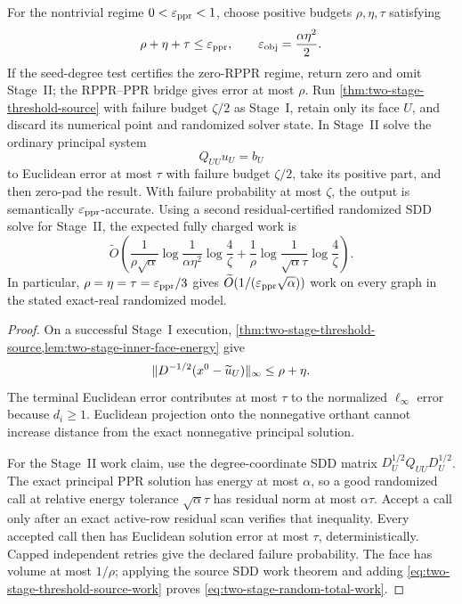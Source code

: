 \begin{theorem}
\label{thm:two-stage-randomized-completion}
For the nontrivial regime $0<\varepsilon_{\mathrm{ppr}}<1$, choose positive budgets
$\rho,\eta,\tau$ satisfying
\begin{equation}
 \rho+\eta+\tau\leq\varepsilon_{\mathrm{ppr}},
 \qquad
 \varepsilon_{\rm obj}=\frac{\alpha\eta^2}{2}.
 \label{eq:two-stage-random-budget}
\end{equation}
If the seed-degree test certifies the zero-RPPR regime, return zero and omit
Stage~II; the RPPR--PPR bridge gives error at most $\rho$.
Run \cref{thm:two-stage-threshold-source} with failure budget $\zeta/2$ as
Stage~I, retain only its face $U$, and discard its numerical point and
randomized solver state.  In
Stage~II solve the ordinary principal system
\begin{equation}
 Q_{UU}u_U=b_U
 \label{eq:two-stage-random-tail}
\end{equation}
to Euclidean error at most $\tau$ with failure budget $\zeta/2$, take its
positive part, and then zero-pad the result.  With failure probability at
most $\zeta$, the output is semantically
$\varepsilon_{\mathrm{ppr}}$-accurate.  Using a second residual-certified randomized SDD solve
for Stage~II, the expected fully charged work is
\begin{equation}
 \widetilde O\!\left(
  \frac{1}{\rho\sqrt\alpha}
  \log\frac1{\alpha\eta^2}
  \log\frac4\zeta
  +\frac1\rho
  \log\frac1{\sqrt\alpha\tau}
  \log\frac4\zeta
 \right).
 \label{eq:two-stage-random-total-work}
\end{equation}
In particular, $\rho=\eta=\tau=\varepsilon_{\mathrm{ppr}}/3$ gives
$\widetilde O(1/(\varepsilon_{\mathrm{ppr}}\sqrt\alpha))$ work on every graph in the stated
exact-real randomized model.
\end{theorem}

\begin{proof}
On a successful Stage~I execution,
\cref{thm:two-stage-threshold-source,lem:two-stage-inner-face-energy} give
\begin{equation*}
 \lVert D^{-1/2}(x^0-\widetilde u_U)\rVert_\infty
 \leq\rho+\eta.
\end{equation*}
The terminal Euclidean error contributes at most $\tau$ to the normalized
$\ell_\infty$ error because $d_i\geq1$.  Euclidean projection onto the
nonnegative orthant cannot increase distance from the exact nonnegative
principal solution.

For the Stage~II work claim, use the degree-coordinate SDD matrix
$D_U^{1/2}Q_{UU}D_U^{1/2}$.  The exact principal PPR solution has energy at
most $\alpha$, so a good randomized call at relative energy tolerance
$\sqrt\alpha\tau$ has residual norm at most $\alpha\tau$.  Accept a call
only after an exact active-row residual scan verifies that inequality.  Every
accepted call then has Euclidean solution error at most $\tau$,
deterministically.  Capped independent retries give the declared failure
probability.  The face has volume at most $1/\rho$; applying the source SDD
work theorem and adding \cref{eq:two-stage-threshold-source-work} proves
\cref{eq:two-stage-random-total-work}.
\end{proof}

